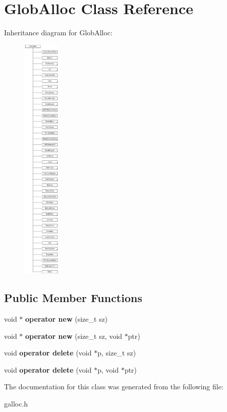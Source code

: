 \hypertarget{classGlobAlloc}{\section{Glob\-Alloc Class Reference}
\label{classGlobAlloc}
}
Inheritance diagram for Glob\-Alloc\-:\begin{figure}[H]
\begin{center}
\leavevmode
\includegraphics[height=12.000000cm]{classGlobAlloc}
\end{center}
\end{figure}
\subsection*{Public Member Functions}
\begin{DoxyCompactItemize}
\item 
\hypertarget{classGlobAlloc_acb2be4eaf93b490cf8c419aeccb53cee}{void $\ast$ {\bfseries operator new} (size\-\_\-t sz)}\label{classGlobAlloc_acb2be4eaf93b490cf8c419aeccb53cee}

\item 
\hypertarget{classGlobAlloc_ac16473b410af2b03d37dbdc97e43e629}{void $\ast$ {\bfseries operator new} (size\-\_\-t sz, void $\ast$ptr)}\label{classGlobAlloc_ac16473b410af2b03d37dbdc97e43e629}

\item 
\hypertarget{classGlobAlloc_aabc8fd6722597a3cfe37cf36352e304c}{void {\bfseries operator delete} (void $\ast$p, size\-\_\-t sz)}\label{classGlobAlloc_aabc8fd6722597a3cfe37cf36352e304c}

\item 
\hypertarget{classGlobAlloc_a53bb1bf97b9034b956963fae5b710d3a}{void {\bfseries operator delete} (void $\ast$p, void $\ast$ptr)}\label{classGlobAlloc_a53bb1bf97b9034b956963fae5b710d3a}

\end{DoxyCompactItemize}


The documentation for this class was generated from the following file\-:\begin{DoxyCompactItemize}
\item 
galloc.\-h\end{DoxyCompactItemize}
